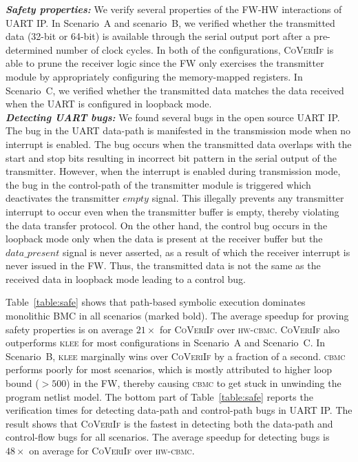 \documentclass[sigconf]{acmart}
\newcommand{\tool}[1]{\textsc{#1}\xspace}
\newcommand{\cbmcv}{\tool{cbmc}}
\newcommand{\hwcbmcv}{\tool{hw-cbmc}}
\newcommand{\verifox}{\tool{CoVeriIf}}
\newcommand{\klee}{\tool{klee}}
\begin{document}
\textbf{\emph{Safety properties:}}
We verify several properties of the FW-HW interactions of UART IP. 
In Scenario~A and scenario~B, we verified whether
the transmitted data (32-bit or 64-bit) is available through the serial
output port after a pre-determined number of clock cycles.
In both of the
configurations, \verifox is able to prune the receiver logic since the
FW only exercises the transmitter module by appropriately configuring
the memory-mapped registers.  In Scenario~C, we verified whether the transmitted
data matches the data received when the UART is configured in loopback
mode.\\ 
\textbf{\emph{Detecting UART bugs:}}
We found several bugs in the open source UART IP. 
The bug in the UART data-path is manifested in the transmission mode when no
interrupt is enabled.  The bug occurs when the transmitted data overlaps
with the start and stop bits resulting in incorrect bit pattern in the
serial output of the transmitter.  However, when the interrupt is enabled
during transmission mode, the bug in the control-path of the transmitter
module is triggered which deactivates the transmitter $empty$ signal.  This
illegally prevents any transmitter interrupt to occur even when the
transmitter buffer is empty, thereby violating the data transfer protocol. 
On the other hand, the control bug occurs in the loopback mode only when the
data is present at the receiver buffer but the $data\_present$ signal is
never asserted, as a result of which the receiver interrupt is never issued
in the FW. Thus, the transmitted data is not the same as the received
data in loopback mode leading to a control bug.

Table~\ref{table:safe} shows that path-based symbolic execution dominates
monolithic BMC in all scenarios (marked bold).  The average speedup for
proving safety properties is on average $21\times$ for \verifox over
\hwcbmcv.  \verifox also outperforms \klee for most configurations in
Scenario~A and Scenario~C.  In Scenario~B, \klee marginally wins over
\verifox by a fraction of a second.  \cbmcv performs poorly for most
scenarios, which is mostly attributed to higher loop bound ($>500$) in the
FW, thereby causing \cbmcv to get stuck in unwinding the program netlist
model.  The bottom part of Table~\ref{table:safe} reports the verification
times for detecting data-path and control-path bugs in UART IP.  The result
shows that \verifox is the fastest in detecting both the data-path and
control-flow bugs for all scenarios.  The average speedup for detecting bugs
is $48\times$ on average for \verifox over \hwcbmcv.
\end{document}
